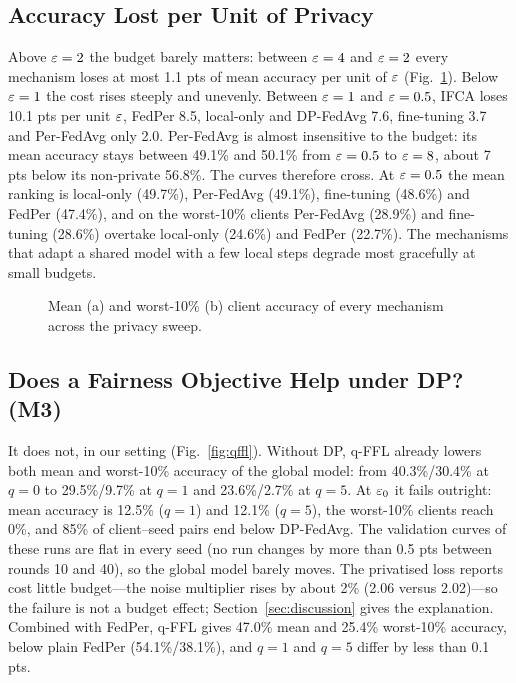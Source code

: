 \subsection{Accuracy Lost per Unit of Privacy}
Above $\varepsilon=2$ the budget barely matters: between $\varepsilon=4$ and $\varepsilon=2$ every mechanism loses at most 1.1 pts of mean
accuracy per unit of $\varepsilon$ (Fig.~\ref{fig:m2sweep}). Below $\varepsilon=1$ the cost rises steeply and unevenly. Between
$\varepsilon=1$ and $\varepsilon=0.5$, IFCA loses 10.1 pts per unit $\varepsilon$, FedPer 8.5, local-only and DP-FedAvg 7.6, fine-tuning
3.7 and Per-FedAvg only 2.0. Per-FedAvg is almost insensitive to the budget: its mean accuracy stays between 49.1\%
and 50.1\% from $\varepsilon=0.5$ to $\varepsilon=8$, about 7 pts below its non-private 56.8\%. The curves therefore cross. At
$\varepsilon=0.5$ the mean ranking is local-only (49.7\%), Per-FedAvg (49.1\%), fine-tuning (48.6\%) and FedPer (47.4\%), and
on the worst-10\% clients Per-FedAvg (28.9\%) and fine-tuning (28.6\%) overtake local-only (24.6\%) and FedPer
(22.7\%). The mechanisms that adapt a shared model with a few local steps degrade most gracefully at small budgets.

\begin{figure}[!t]
\centering
{}
\caption{Mean (a) and worst-10\% (b) client accuracy of every mechanism across the privacy sweep.}
\label{fig:m2sweep}
\end{figure}

\subsection{Does a Fairness Objective Help under DP? (M3)}
It does not, in our setting (Fig.~\ref{fig:qffl}). Without DP, q-FFL already lowers both mean and worst-10\%
accuracy of the global model: from 40.3\%/30.4\% at $q=0$ to 29.5\%/9.7\% at $q=1$ and 23.6\%/2.7\% at $q=5$. At
$\varepsilon_0$ it fails outright: mean accuracy is 12.5\% ($q=1$) and 12.1\% ($q=5$), the worst-10\% clients reach 0\%, and
85\% of client--seed pairs end below DP-FedAvg. The validation curves of these runs are flat in every seed (no run
changes by more than 0.5 pts between rounds 10 and 40), so the global model barely moves. The privatised loss reports cost little budget---the noise multiplier
rises by about 2\% (2.06 versus 2.02)---so the failure is not a budget effect; Section~\ref{sec:discussion} gives the
explanation. Combined with FedPer, q-FFL gives 47.0\% mean and 25.4\% worst-10\% accuracy, below plain FedPer
(54.1\%/38.1\%), and $q=1$ and $q=5$ differ by less than 0.1 pts.

